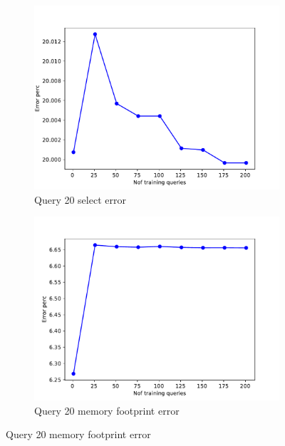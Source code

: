 \begin{figure}[!htb]
    \begin{subfigure}[t]{0.5\textwidth}
      \includegraphics[scale=0.4]{figs/tpch10/tpch10_sel20_error.pdf}
      \caption{Query 20 select error}
      \label{fig:tpch_sel20}
     \end{subfigure}
     \begin{subfigure}[t]{0.5\textwidth}
       \includegraphics[scale=0.4]{figs/tpch10/tpch10_q20_memerror.pdf}
       \caption{Query 20 memory footprint error}
       \label{fig:tpch_mem20}
     \end{subfigure}


\end{figure}
